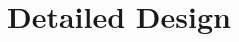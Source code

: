 \documentclass{report}
\begin{document}
\chapter{Detailed Design}\label{ch:detailed-design}
\end{document}
